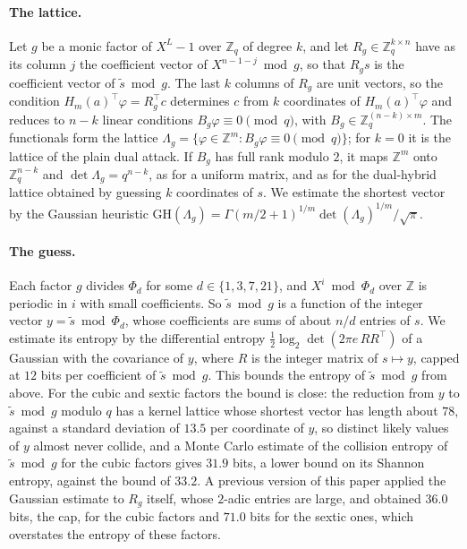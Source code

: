 \documentclass[11pt,a4paper]{article}
\theoremstyle{definition}
\newcommand{\Z}{\mathbb{Z}}
\newcommand{\Zq}{\mathbb{Z}_q}
\begin{document}
\paragraph{The lattice.} Let $g$ be a monic factor of $X^L - 1$ over $\Zq$ of degree $k$, and let $R_g \in \Zq^{k \times n}$ have as its column $j$ the coefficient vector of $X^{n-1-j} \bmod g$, so that $R_g s$ is the coefficient vector of $\tilde{s} \bmod g$. The last $k$ columns of $R_g$ are unit vectors, so the condition $H_m(a)^{\top}\varphi = R_g^{\top} c$ determines $c$ from $k$ coordinates of $H_m(a)^{\top}\varphi$ and reduces to $n - k$ linear conditions $B_g \varphi \equiv 0 \pmod q$, with $B_g \in \Zq^{(n-k) \times m}$. The functionals form the lattice $\Lambda_g = \{\varphi \in \Z^m : B_g \varphi \equiv 0 \pmod q\}$; for $k = 0$ it is the lattice of the plain dual attack. If $B_g$ has full rank modulo $2$, it maps $\Z^m$ onto $\Zq^{n-k}$ and $\det \Lambda_g = q^{n-k}$, as for a uniform matrix, and as for the dual-hybrid lattice obtained by guessing $k$ coordinates of $s$. We estimate the shortest vector by the Gaussian heuristic $\mathrm{GH}(\Lambda_g) = \Gamma(m/2 + 1)^{1/m} \det(\Lambda_g)^{1/m} / \sqrt{\pi}$.

\paragraph{The guess.} Each factor $g$ divides $\Phi_d$ for some $d \in \{1, 3, 7, 21\}$, and $X^i \bmod \Phi_d$ over $\Z$ is periodic in $i$ with small coefficients. So $\tilde{s} \bmod g$ is a function of the integer vector $y = \tilde{s} \bmod \Phi_d$, whose coefficients are sums of about $n/d$ entries of $s$. We estimate its entropy by the differential entropy $\tfrac12 \log_2 \det(2\pi e\, R R^{\top})$ of a Gaussian with the covariance of $y$, where $R$ is the integer matrix of $s \mapsto y$, capped at $12$ bits per coefficient of $\tilde{s} \bmod g$. This bounds the entropy of $\tilde{s} \bmod g$ from above. For the cubic and sextic factors the bound is close: the reduction from $y$ to $\tilde{s} \bmod g$ modulo $q$ has a kernel lattice whose shortest vector has length about $78$, against a standard deviation of $13.5$ per coordinate of $y$, so distinct likely values of $y$ almost never collide, and a Monte Carlo estimate of the collision entropy of $\tilde{s} \bmod g$ for the cubic factors gives $31.9$ bits, a lower bound on its Shannon entropy, against the bound of $33.2$. A previous version of this paper applied the Gaussian estimate to $R_g$ itself, whose $2$-adic entries are large, and obtained $36.0$ bits, the cap, for the cubic factors and $71.0$ bits for the sextic ones, which overstates the entropy of these factors.
\end{document}
